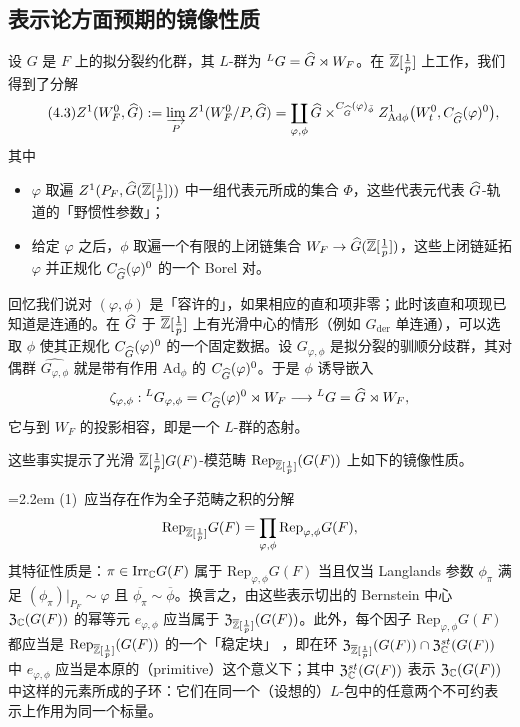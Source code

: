\subsection{表示论方面预期的镜像性质}

设 $G$ 是 $F$ 上的拟分裂约化群，其 $L$-群为 ${}^LG=\widehat{G}\rtimes W_F$。在 $\overline{\mathbb{Z}}[\frac1p]$ 上工作，我们得到了分解
\begin{equation*}\tag*{(4.3)}
Z^1(W^0_F,\widehat{G}):=\varinjlim_{P}Z^1(W^0_F/P,\widehat{G})
=\coprod_{\varphi,\phi}\widehat{G}\times^{C_{\widehat{G}}(\varphi)_{\bar\phi}}
Z^1_{\mathrm{Ad}\phi}\bigl(W^0_t,C_{\widehat{G}}(\varphi)^0\bigr),
\end{equation*}
其中
\begin{itemize}[leftmargin=1.6em,itemsep=0.2em]
\item $\varphi$ 取遍 $Z^1(P_F,\widehat{G}(\overline{\mathbb{Z}}[\frac1p]))$ 中一组代表元所成的集合 $\Phi$，这些代表元代表 $\widehat{G}$-轨道的「野惯性参数」；
\item 给定 $\varphi$ 之后，$\phi$ 取遍一个有限的上闭链集合 $W_F\to\widehat{G}(\overline{\mathbb{Z}}[\frac1p])$，这些上闭链延拓 $\varphi$ 并正规化 $C_{\widehat{G}}(\varphi)^0$ 的一个 Borel 对。
\end{itemize}
回忆我们说对 $(\varphi,\phi)$ 是「容许的」，如果相应的直和项非零；此时该直和项现已知道是连通的。在 $\widehat{G}$ 于 $\overline{\mathbb{Z}}[\frac1p]$ 上有光滑中心的情形（例如 $G_{\mathrm{der}}$ 单连通），可以选取 $\phi$ 使其正规化 $C_{\widehat{G}}(\varphi)^0$ 的一个固定数据。设 $G_{\varphi,\phi}$ 是拟分裂的驯顺分歧群，其对偶群 $\widehat{G_{\varphi,\phi}}$ 就是带有作用 $\mathrm{Ad}_\phi$ 的 $C_{\widehat{G}}(\varphi)^0$。于是 $\phi$ 诱导嵌入
\[
\zeta_{\varphi,\phi}:{}^LG_{\varphi,\phi}=C_{\widehat{G}}(\varphi)^0\rtimes W_F
\longrightarrow{}^LG=\widehat{G}\rtimes W_F,
\]
它与到 $W_F$ 的投影相容，即是一个 $L$-群的态射。

这些事实提示了光滑 $\overline{\mathbb{Z}}[\frac1p]G(F)$-模范畴 $\mathrm{Rep}_{\overline{\mathbb{Z}}[\frac1p]}(G(F))$ 上如下的镜像性质。

\medskip
\noindent\hangindent=2.2em
(1)\ 应当存在作为全子范畴之积的分解
\[
\mathrm{Rep}_{\overline{\mathbb{Z}}[\frac1p]}G(F)=\prod_{\varphi,\phi}\mathrm{Rep}_{\varphi,\phi}G(F),
\]
其特征性质是：$\pi\in\mathrm{Irr}_{\mathbb{C}}G(F)$ 属于 $\mathrm{Rep}_{\varphi,\phi}G(F)$ 当且仅当 Langlands 参数 $\phi_\pi$ 满足 $(\phi_\pi)|_{P_F}\sim\varphi$ 且 $\overline{\phi_\pi}\sim\overline{\phi}$。换言之，由这些表示切出的 Bernstein 中心 $\mathfrak Z_{\mathbb{C}}(G(F))$ 的幂等元 $e_{\varphi,\phi}$ 应当属于 $\mathfrak Z_{\overline{\mathbb{Z}}[\frac1p]}(G(F))$。此外，每个因子 $\mathrm{Rep}_{\varphi,\phi}G(F)$ 都应当是 $\mathrm{Rep}_{\overline{\mathbb{Z}}[\frac1p]}(G(F))$ 的一个「稳定块」
，即在环 $\mathfrak Z_{\overline{\mathbb{Z}}[\frac1p]}(G(F))\cap\mathfrak Z^{st}_{\mathbb{C}}(G(F))$ 中 $e_{\varphi,\phi}$ 应当是本原的（primitive）这个意义下；其中 $\mathfrak Z^{st}_{\mathbb{C}}(G(F))$ 表示 $\mathfrak Z_{\mathbb{C}}(G(F))$ 中这样的元素所成的子环：它们在同一个（设想的）$L$-包中的任意两个不可约表示上作用为同一个标量。

